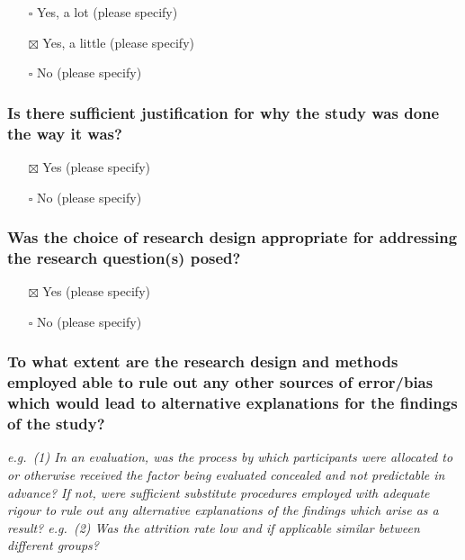 \documentclass[
  doc, a4paper]{apa7}
\providecommand{\tightlist}{%
  \setlength{\itemsep}{0pt}\setlength{\parskip}{0pt}}
\begin{document}
\begin{itemize}
\tightlist
\item[$\square$]
  Yes, a lot (please specify)
\item[$\boxtimes$]
  Yes, a little (please specify)
\item[$\square$]
  No (please specify)
\end{itemize}

\subsubsection{Is there sufficient justification for why the study was done the way it was?}\label{is-there-sufficient-justification-for-why-the-study-was-done-the-way-it-was}

\begin{itemize}
\tightlist
\item[$\boxtimes$]
  Yes (please specify)
\item[$\square$]
  No (please specify)
\end{itemize}

\subsubsection{Was the choice of research design appropriate for addressing the research question(s) posed?}\label{was-the-choice-of-research-design-appropriate-for-addressing-the-research-questions-posed}

\begin{itemize}
\tightlist
\item[$\boxtimes$]
  Yes (please specify)
\item[$\square$]
  No (please specify)
\end{itemize}

\subsubsection{To what extent are the research design and methods employed able to rule out any other sources of error/bias which would lead to alternative explanations for the findings of the study?}\label{to-what-extent-are-the-research-design-and-methods-employed-able-to-rule-out-any-other-sources-of-errorbias-which-would-lead-to-alternative-explanations-for-the-findings-of-the-study}

\emph{e.g.~(1) In an evaluation, was the process by which participants were allocated to or otherwise received the factor being evaluated concealed and not predictable in advance? If not, were sufficient substitute procedures employed with adequate rigour to rule out any alternative explanations of the findings which arise as a result? e.g.~(2) Was the attrition rate low and if applicable similar between different groups?}
\end{document}
